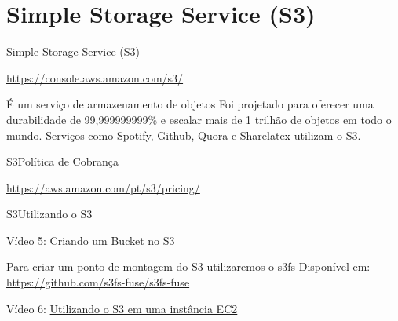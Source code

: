 \documentclass[xcolor=table]{beamer}
\begin{document}
\section{Simple Storage Service (S3)}
\begin{frame}[c]{Simple Storage Service (S3)}

        \begin{outline}
            \1[]\url{https://console.aws.amazon.com/s3/}
        \end{outline}
        
        \begin{center}
            \begin{outline}                
                \1 É um serviço de armazenamento de objetos
                \1 Foi projetado para oferecer uma durabilidade de 99,999999999\% e escalar mais de 1 trilhão de objetos em todo o mundo.
                \vskip 0.5cm
                \2[] Serviços como Spotify, Github, Quora e Sharelatex utilizam o S3.
            \end{outline}
        \end{center}  
        
\end{frame}


\begin{frame}[c]{S3}{Política de Cobrança}


        \begin{outline}
            \1[]\url{https://aws.amazon.com/pt/s3/pricing/}
        \end{outline}
        
            
            \begin{center}
                
            \end{center}           
       
\end{frame}


\begin{frame}[c]{S3}{Utilizando o S3}

        
        \begin{center}
            Vídeo 5: \href{run:./5_s3.ogv}{Criando um Bucket no S3}
        \end{center}       
       
        
            \begin{outline}
                \1 Para criar um ponto de montagem do S3 utilizaremos o s3fs
                \2 Disponível em: \url{https://github.com/s3fs-fuse/s3fs-fuse}
            \end{outline}
        
        \begin{center}
            Vídeo 6: \href{run:./6_mountS3.ogv}{Utilizando o S3 em uma instância EC2}
        \end{center}       
       
\end{frame}
\end{document}
